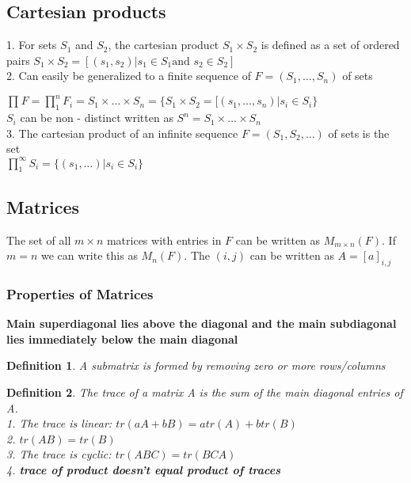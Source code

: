 \documentclass [12pt]{article}
\newtheorem {definition}{Definition}
\begin{document}
\subsection {Cartesian products} 1. For sets $S_1$ and $S_2$, the cartesian
product $S_1\times S_2$ is defined as a set of ordered pairs \(S_1\times S_2=[{(s_1,s_2)|s_1\in S_1{\text {
and }}s_2\in S_2}]\)\\

2. Can easily be generalized to a finite sequence of $F=(S_1,\ldots ,S_n)$
of sets 

\(\prod _{}^{}F=\prod _{1}^{n}F_i=S_1\times \ldots \times S_n=\{S_1\times S_2=[(s_1,\ldots ,s_n)|s_i\in S_i\}\)\\
$S_i$ can be non - distinct written as \(S^n=S_1\times \ldots \times S_n\)\\

3. The cartesian product of an infinite sequence $F=(S_1,S_2,\ldots )$ of
sets is the set \\

\(\prod _{1}^{\infty }S_i=\{(s_1,\ldots )|s_i\in S_i\}\) 


\subsection {Matrices} The set of all $m\times n$ matrices with entries
in $F$ can be written as $M_{m\times n}(F)$. If $m=n$ we can write this
as $M_n(F)$. The $(i,j)$ can be written as $A=[a]_{i,j}$ 


\subsubsection {Properties of Matrices} \textbf{Main superdiagonal lies
above the diagonal and the main subdiagonal lies immediately below the main
diagonal} 

\begin {definition}
 A submatrix is formed by removing zero or more rows/columns 
\end {definition}
 

\begin {definition}
 The trace of a matrix A is the sum of the main diagonal entries of A. \\

1. The trace is linear: $tr(aA+bB)=atr(A)+btr(B)$\\
2. $tr(AB)=tr(B)$\\
3. The trace is cyclic: $tr(ABC)=tr(BCA)$\\
4. \textbf{trace of product doesn't equal product of traces} 
\end {definition}
 
\end{document}
